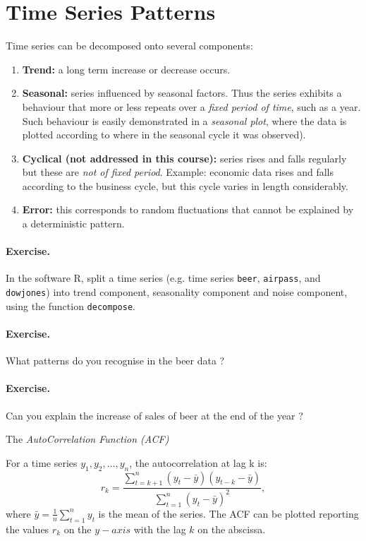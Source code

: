 \documentclass[a4paper,11pt,oneside,onecolumn]{book}
\begin{document}
\section{Time Series Patterns}
Time series can be decomposed onto several components:
\begin{enumerate}
\item \textbf{Trend:} a long term increase or decrease occurs.

\item \textbf{Seasonal:} series influenced by seasonal factors. Thus the
series exhibits a behaviour that more or less repeats over a {\it
fixed period of time}, such as a year. Such behaviour is easily
demonstrated in a {\it seasonal plot},
where the data is plotted according to where in the seasonal cycle
it was observed).
\item \textbf{Cyclical (not addressed in this course):} series rises and falls regularly but these are
{\it not of fixed period}. Example: economic data rises and falls
according to the business cycle, but this cycle varies in length
considerably.
\item \textbf{Error:} this corresponds to random fluctuations that cannot be explained by a deterministic pattern.
\end{enumerate}


\paragraph{Exercise.} In the software R, split a time series (e.g. time series \texttt{beer}, \texttt{airpass}, and \texttt{dowjones}) into trend component, seasonality component and noise component, using the function \texttt{decompose}.
  



\paragraph{Exercise.} What patterns do you recognise in the beer data ?

\paragraph{Exercise.} Can you explain the increase of sales of beer at the end of the year ?



\begin{definition}
The {\it AutoCorrelation Function (ACF)} 

For a time series $y_1,y_2,\ldots,y_n$,  the autocorrelation at lag  k is:
$$
r_k =  \frac{\sum_{t=k+1}^n
(y_t - \bar{y})(y_{t-k}-\bar{y})}{\sum_{t=1}^n (y_t - \bar{y})^2},
$$
where $\bar{y}=\frac{1}{n}\sum_{t=1}^n y_t $ is the mean of the series. 
The ACF can be plotted reporting the values $r_k$ on the $y-axis$ with the lag $k$ on the abscissa.

\label{def:ACF}
\end{definition}
\end{document}
